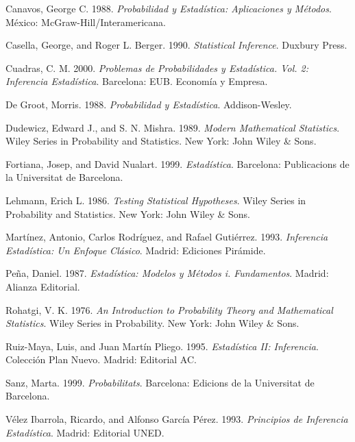 \documentclass[
]{article}
\newlength{\cslhangindent}
\newenvironment{CSLReferences}[2] %
 {\begin{list}{}{%
  \setlength{\itemindent}{0pt}
  \setlength{\leftmargin}{0pt}
  \setlength{\parsep}{0pt}
  \ifodd #1
   \setlength{\leftmargin}{\cslhangindent}
   \setlength{\itemindent}{-1\cslhangindent}
  \fi
  \setlength{\itemsep}{#2\baselineskip}}}
 {\end{list}}
\begin{document}
\label{refs}
\begin{CSLReferences}{1}{0}
Canavos, George C. 1988. \emph{Probabilidad y Estadística: Aplicaciones y Métodos}. México: McGraw-Hill/Interamericana.

Casella, George, and Roger L. Berger. 1990. \emph{Statistical Inference}. Duxbury Press.

Cuadras, C. M. 2000. \emph{Problemas de Probabilidades y Estadística. Vol. 2: Inferencia Estadística}. Barcelona: EUB. Economía y Empresa.

De Groot, Morris. 1988. \emph{Probabilidad y Estadística}. Addison-Wesley.

Dudewicz, Edward J., and S. N. Mishra. 1989. \emph{Modern Mathematical Statistics}. Wiley Series in Probability and Statistics. New York: John Wiley \& Sons.

Fortiana, Josep, and David Nualart. 1999. \emph{Estadística}. Barcelona: Publicacions de la Universitat de Barcelona.

Lehmann, Erich L. 1986. \emph{Testing Statistical Hypotheses}. Wiley Series in Probability and Statistics. New York: John Wiley \& Sons.

Martínez, Antonio, Carlos Rodríguez, and Rafael Gutiérrez. 1993. \emph{Inferencia Estadística: Un Enfoque Clásico}. Madrid: Ediciones Pirámide.

Peña, Daniel. 1987. \emph{Estadística: Modelos y Métodos i. Fundamentos}. Madrid: Alianza Editorial.

Rohatgi, V. K. 1976. \emph{An Introduction to Probability Theory and Mathematical Statistics}. Wiley Series in Probability. New York: John Wiley \& Sons.

Ruiz-Maya, Luis, and Juan Martín Pliego. 1995. \emph{Estadística II: Inferencia}. Colección Plan Nuevo. Madrid: Editorial AC.

Sanz, Marta. 1999. \emph{Probabilitats}. Barcelona: Edicions de la Universitat de Barcelona.

Vélez Ibarrola, Ricardo, and Alfonso García Pérez. 1993. \emph{Principios de Inferencia Estadística}. Madrid: Editorial UNED.

\end{CSLReferences}
\end{document}

